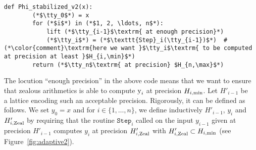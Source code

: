 \documentclass[11pt]{article}
\numberwithin{equation}{section}
\numberwithin{figure}{section}
\theoremstyle{definition}
\renewcommand{\min}{\text{\rm min}}
\renewcommand{\max}{\text{\rm max}}
\newcommand{\zealous}{\text{\rm Zeal}}
\newcommand{\tty}{\texttt{\rm y}\xspace}
\begin{document}
\begin{lstlisting}[label={algo:phistabzealousv2}]
    def Phi_stabilized_v2(x):
        (*$\tty_0$*) = x
        for (*$i$*) in (*$1, 2, \ldots, n$*):
            lift (*$\tty_{i-1}$\textrm{ at enough precision}*)
            (*$\tty_i$*) = (*$\texttt{Step}_i(\tty_{i-1})$*)  # (*\color{comment}\textrm{here we want }$\tty_i$\textrm{ to be computed at precision at least }$H_{i,\min}$*)
        return (*$\tty_n$\textrm{ at precision} $H_{n,\max}$*)
\end{lstlisting}

\noindent
The locution ``enough precision'' in the above code means that we
want to ensure that zealous arithmetics is able to compute $\tty_i$ 
at precision $H_{i,\min}$. Let $H'_{i-1}$ be a lattice encoding such
an acceptable precision. Rigorously, it can be defined as follows. We
set $y_0 = x$ and for $i \in \{1,\ldots, n\}$, we define inductively 
$H'_{i-1}$, $y_i$ and $H'_{i,\zealous}$ by requiring that the routine 
$\texttt{Step}_i$ called on the input $y_{i-1}$ given at precision 
$H'_{i-1}$ computes $y_i$ at precision $H'_{i,\zealous}$ with 
$H'_{i,\zealous} \subset H_{i,\min}$ (see Figure~\ref{fig:adaptive2}). 
%
\end{document}
